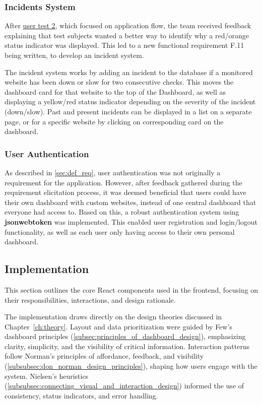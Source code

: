 \subsubsection{Incidents System}
After \hyperref[subsec:user_testing]{user test 2}, which focused on application flow, the team received feedback explaining that test subjects wanted a better way to identify why a red/orange status indicator was displayed. This led to a new functional requirement F.11 being written, to develop an incident system.

The incident system works by adding an incident to the database if a monitored website has been down or slow for two consecutive checks. This moves the dashboard card  for that website to the top of the Dashboard, as well as displaying a yellow/red status indicator depending on the severity of the incident (down/slow). Past and present incidents can be displayed in a list on a separate page, or for a specific website by clicking on corresponding card on the dashboard.

\subsubsection{User Authentication}
As described in \autoref{sec:def_req}, user authentication was not originally a requirement for the application. However, after feedback gathered during the requirement elicitation process, it was deemed beneficial that users could have their own dashboard with custom websites, instead of one central dashboard that everyone had access to. Based on this, a robust authentication system using \textbf{\gls{jsonwebtoken}} was implemented. This enabled user registration and login/logout functionality, as well as each user only having access to their own personal dashboard.




\subsection{Implementation}
This section outlines the core React components used in the frontend, focusing on their responsibilities, interactions, and design rationale.

The implementation draws directly on the design theories discussed in Chapter~\ref{ch:theory}. Layout and data prioritization were guided by Few’s dashboard principles (\autoref{subsec:principles_of_dashboard_design}), emphasizing clarity, simplicity, and the visibility of critical information. Interaction patterns follow Norman’s principles of affordance, feedback, and visibility (\autoref{subsubsec:don_norman_design_principles}), shaping how users engage with the system. Nielsen’s heuristics (\autoref{subsubsec:connecting_visual_and_interaction_design}) informed the use of consistency, status indicators, and error handling.

